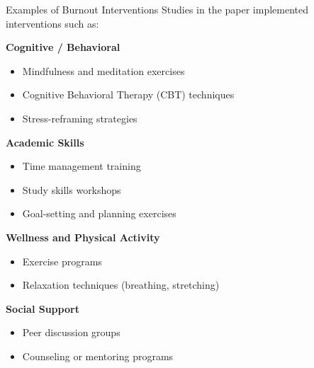 \documentclass[dvipsnames]{beamer}
\begin{document}
\begin{frame}{Examples of Burnout Interventions}
Studies in the paper implemented interventions such as:



\textbf{Cognitive / Behavioral}
\begin{itemize}
    \item Mindfulness and meditation exercises
    \item Cognitive Behavioral Therapy (CBT) techniques
    \item Stress-reframing strategies
\end{itemize}



\textbf{Academic Skills}
\begin{itemize}
    \item Time management training
    \item Study skills workshops
    \item Goal-setting and planning exercises
\end{itemize}
\end{frame}
\begin{frame}


\textbf{Wellness and Physical Activity}
\begin{itemize}
    \item Exercise programs
    \item Relaxation techniques (breathing, stretching)
\end{itemize}



\textbf{Social Support}
\begin{itemize}
    \item Peer discussion groups
    \item Counseling or mentoring programs
\end{itemize}

\end{frame}









\end{document}
